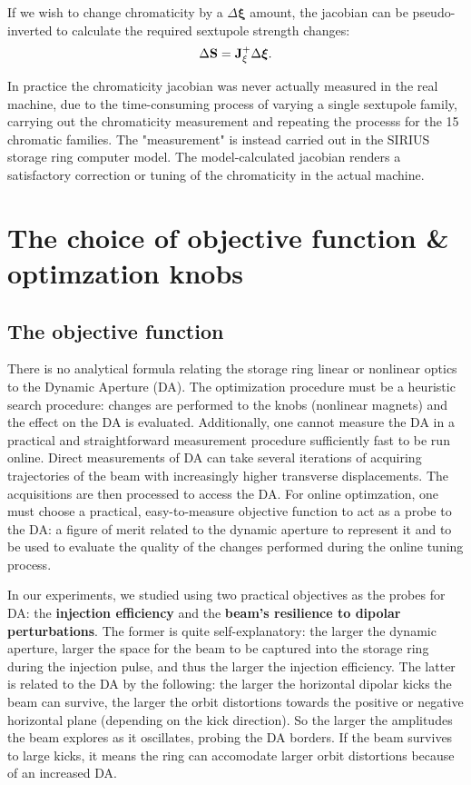 If we wish to change chromaticity by a $\Delta\boldsymbol{\xi}$ amount, the jacobian can be pseudo-inverted to calculate the required sextupole strength changes:
\begin{equation}
    \Delta \vb{S} = \vb{J}_{\xi}^{+}\Delta \boldsymbol{\xi}.
\end{equation}

In practice the chromaticity jacobian was never actually measured in the real machine, due to the time-consuming process of varying a single sextupole family, carrying out the chromaticity measurement and repeating the processs for the 15 chromatic families. The "measurement" is instead carried out in the SIRIUS storage ring computer model. The model-calculated jacobian renders a satisfactory correction or tuning of the chromaticity in the actual machine.
\section{The choice of objective function \& optimzation knobs}

\subsection{The objective function}
\label{subsec:objective_function}
There is no analytical formula relating the storage ring linear or nonlinear optics to the Dynamic Aperture (DA). The optimization procedure must be a heuristic search procedure: changes are performed to the knobs (nonlinear magnets) and the effect on the DA is evaluated. Additionally, one cannot measure the DA in a practical and straightforward measurement procedure sufficiently fast to be run online. Direct measurements of DA can take several iterations of acquiring trajectories of the beam with increasingly higher transverse displacements. The acquisitions are then processed to access the DA. For online optimzation, one must choose a practical, easy-to-measure objective function to act as a probe to the DA: a figure of merit related to the dynamic aperture to represent it and to be used to evaluate the quality of the changes performed during the online tuning process.

In our experiments, we studied using two practical objectives as the probes for DA: the \textbf{injection efficiency} and the \textbf{beam's resilience to dipolar perturbations}. The former is quite self-explanatory: the larger the dynamic aperture, larger the space for the beam to be captured into the storage ring during the injection pulse, and thus the larger the injection efficiency. The latter is related to the DA by the following: the larger the horizontal dipolar kicks the beam can survive, the larger the orbit distortions towards the positive or negative horizontal plane (depending on the kick direction). So the larger the amplitudes the beam explores as it oscillates, probing the DA borders. If the beam survives to large kicks, it means the ring can accomodate larger orbit distortions because of an increased DA.

